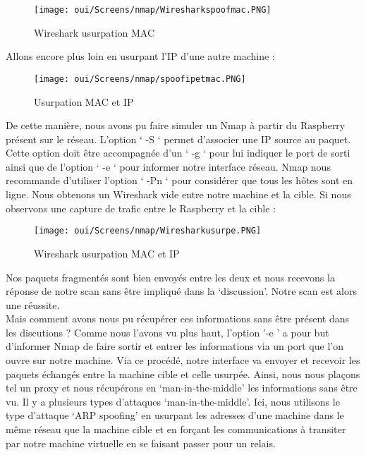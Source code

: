 \begin{figure}[htp!]
  \centering
  \setlength\figureheight{7cm}
  \setlength\figurewidth{9cm}
  \texttt{[image: oui/Screens/nmap/Wiresharkspoofmac.PNG]}
  \caption{Wireshark usurpation MAC}
  \label{fig:courbe-tikz}
\end{figure}

Allons encore plus loin en usurpant l’IP d’une autre machine :

\begin{figure}[htp!]
  \centering
  \setlength\figureheight{7cm}
  \setlength\figurewidth{9cm}
  \texttt{[image: oui/Screens/nmap/spoofipetmac.PNG]}
  \caption{Usurpation MAC et IP}
  \label{fig:courbe-tikz}
\end{figure}

De cette manière, nous avons pu faire simuler un Nmap à partir du Raspberry présent sur le réseau. L’option ‘ -S ‘ permet d’associer une IP source au paquet. Cette option doit être accompagnée d'un ‘ -g ‘ pour lui indiquer le port de sorti ainsi que de l’option ‘ -e ‘ pour informer notre interface réseau. Nmap nous recommande d’utiliser l’option ‘ -Pn ‘ pour considérer que tous les hôtes sont en ligne.
Nous obtenons un Wireshark vide entre notre machine et la cible.
Si nous observons une capture de trafic entre le Raspberry et la cible :

\begin{figure}[htp!]
  \centering
  \setlength\figureheight{7cm}
  \setlength\figurewidth{9cm}
  \texttt{[image: oui/Screens/nmap/Wiresharkusurpe.PNG]}
  \caption{Wireshark usurpation MAC et IP}
  \label{fig:courbe-tikz}
\end{figure}

\noindent Nos paquets fragmentés sont bien envoyés entre les deux et nous recevons la réponse de notre scan sans être impliqué dans la ‘discussion’.
Notre scan est alors une réussite.\\
Mais comment avons nous pu récupérer ces informations sans être présent dans les discutions ? Comme nous l'avons vu plus haut, l'option '-e ' a pour but d'informer Nmap de faire sortir et entrer les informations via un port que l'on ouvre sur notre machine. Via ce procédé, notre interface va envoyer et recevoir les paquets échangés entre la machine cible et celle usurpée.  Ainsi, nous nous plaçons tel un proxy et nous récupérons en ‘man-in-the-middle’ les informations sans être vu. Il y a plusieurs types d’attaques ‘man-in-the-middle’. Ici, nous utilisons le type d’attaque ‘ARP spoofing’ en usurpant les adresses d’une machine dans le même réseau que la machine cible et en forçant les communications à transiter par notre machine virtuelle en se faisant passer pour un relais.

